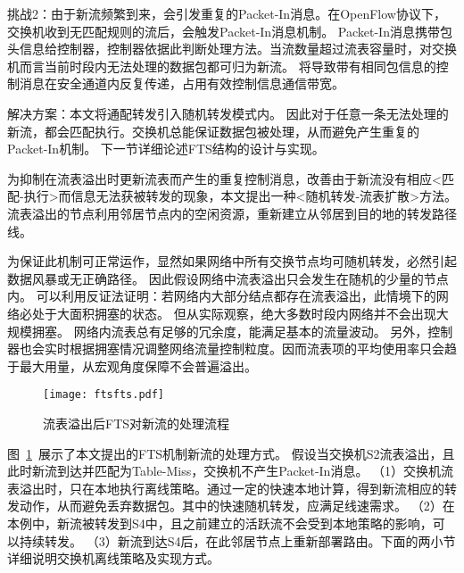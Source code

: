 挑战2：由于新流频繁到来，会引发重复的Packet-In消息。在OpenFlow协议下，交换机收到无匹配规则的流后，会触发Packet-In消息机制。
Packet-In消息携带包头信息给控制器，控制器依据此判断处理方法。当流数量超过流表容量时，对交换机而言当前时段内无法处理的数据包都可归为新流。
将导致带有相同包信息的控制消息在安全通道内反复传递，占用有效控制信息通信带宽。

解决方案：本文将通配转发引入随机转发模式内。
因此对于任意一条无法处理的新流，都会匹配执行。交换机总能保证数据包被处理，从而避免产生重复的Packet-In机制。
下一节详细论述FTS结构的设计与实现。



\label{chap55}

为抑制在流表溢出时更新流表而产生的重复控制消息，改善由于新流没有相应<匹配-执行>而信息无法获被转发的现象，本文提出一种<随机转发-流表扩散>方法。
流表溢出的节点利用邻居节点内的空闲资源，重新建立从邻居到目的地的转发路径线。

为保证此机制可正常运作，显然如果网络中所有交换节点均可随机转发，必然引起数据风暴或无正确路径。
因此假设网络中流表溢出只会发生在随机的少量的节点内。
可以利用反证法证明：若网络内大部分结点都存在流表溢出，此情境下的网络必处于大面积拥塞的状态。
但从实际观察，绝大多数时段内网络并不会出现大规模拥塞。
网络内流表总有足够的冗余度，能满足基本的流量波动。
另外，控制器也会实时根据拥塞情况调整网络流量控制粒度。因而流表项的平均使用率只会趋于最大用量，从宏观角度保障不会普遍溢出。



\begin{figure}[!ht]
	\centering 
	\vspace{-1.5mm} 
	\texttt{[image: ftsfts.pdf]}
	\caption{流表溢出后FTS对新流的处理流程} \label{fig:ftsfts}
\end{figure}

图~\ref{fig:ftsfts}~展示了本文提出的FTS机制新流的处理方式。
假设当交换机S2流表溢出，且此时新流到达并匹配为Table-Miss，交换机不产生Packet-In消息。
（1）交换机流表溢出时，只在本地执行离线策略。通过一定的快速本地计算，得到新流相应的转发动作，从而避免丢弃数据包。其中的快速随机转发，应满足线速需求。
（2）在本例中，新流被转发到S4中，且之前建立的活跃流不会受到本地策略的影响，可以持续转发。
（3）新流到达S4后，在此邻居节点上重新部署路由。下面的两小节详细说明交换机离线策略及实现方式。




